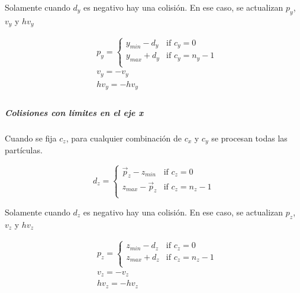 Solamente cuando $d_y$ es negativo hay una colisión. En ese caso, se actualizan
$p_y$, $v_y$ y $hv_y$

\[
\begin{split}
&p_y = 
  \begin{cases}
    y_{min} - d_y & \text{if } c_y = 0\\
    y_{max} + d_y & \text{if } c_y = n_y -1\\
  \end{cases}\\
&v_y = -v_y\\
&hv_y = -hv_y\\
\end{split}
\]

\subparagraph{Colisiones con límites en el eje x}

Cuando se fija $c_z$, 
para cualquier combinación de $c_x$ y $c_y$ se procesan todas
las partículas.

\[
d_z =
\begin{cases}
  \vec{p}_z -z_{min}  & \text{if } c_z = 0\\
  z_{max} - \vec{p}_z & \text{if } c_z = n_z - 1\\
\end{cases}
\]

Solamente cuando $d_z$ es negativo hay una colisión. En ese caso, se actualizan
$p_z$, $v_z$ y $hv_z$

\[
\begin{split}
&p_z = 
  \begin{cases}
    z_{min} - d_z & \text{if } c_z = 0\\
    z_{max} + d_z & \text{if } c_z = n_z -1\\
  \end{cases}\\
&v_z = -v_z\\
&hv_z = -hv_z\\
\end{split}
\]

